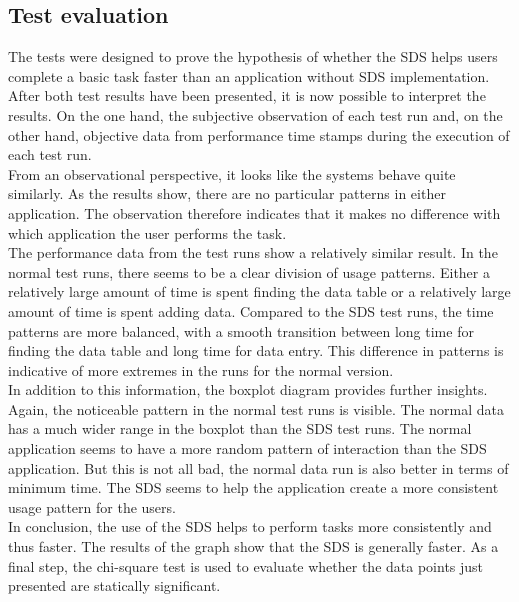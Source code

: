 \subsection{Test evaluation}
The tests were designed to prove the hypothesis of whether the SDS helps users complete a basic task faster than an application without \ac{SDS} implementation. After both test results have been presented, it is now possible to interpret the results. On the one hand, the subjective observation of each test run and, on the other hand, objective data from performance time stamps during the execution of each test run. \\
From an observational perspective, it looks like the systems behave quite similarly. As the results show, there are no particular patterns in either application. The observation therefore indicates that it makes no difference with which application the user performs the task. \\
The performance data from the test runs show a relatively similar result. In the normal test runs, there seems to be a clear division of usage patterns. Either a relatively large amount of time is spent finding the data table or a relatively large amount of time is spent adding data. Compared to the \ac{SDS} test runs, the time patterns are more balanced, with a smooth transition between long time for finding the data table and long time for data entry. This difference in patterns is indicative of more extremes in the runs for the normal version. \\
In addition to this information, the boxplot diagram provides further insights. Again, the noticeable pattern in the normal test runs is visible. The normal data has a much wider range in the boxplot than the \ac{SDS} test runs. The normal application seems to have a more random pattern of interaction than the \ac{SDS} application. But this is not all bad, the normal data run is also better in terms of minimum time. The \ac{SDS} seems to help the application create a more consistent usage pattern for the users. \\
In conclusion, the use of the \ac{SDS} helps to perform tasks more consistently and thus faster. The results of the graph show that the \ac{SDS} is generally faster. As a final step, the chi-square test is used to evaluate whether the data points just presented are statically significant.\\

